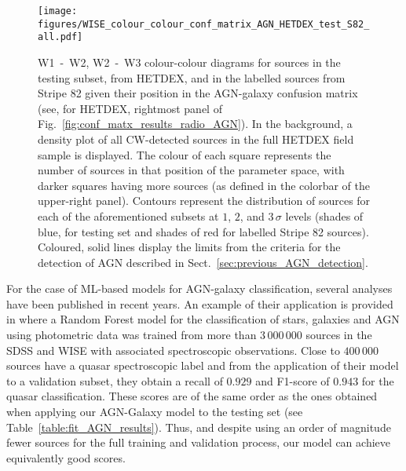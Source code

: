 \documentclass{aa}
\begin{document}
\begin{figure*}
   \centering
   \texttt{[image: figures/WISE\_colour\_colour\_conf\_matrix\_AGN\_HETDEX\_test\_S82\_all.pdf]}
   \caption{W1~-~W2, W2~-~W3 colour-colour diagrams for sources in the testing subset, from HETDEX, and in the labelled sources from Stripe 82 given their position in the AGN-galaxy confusion matrix (see, for HETDEX, rightmost panel of Fig.~\ref{fig:conf_matx_results_radio_AGN}). In the background, a density plot of all CW-detected sources in the full HETDEX field sample is displayed. The colour of each square represents the number of sources in that position of the parameter space, with darker squares having more sources (as defined in the colorbar of the upper-right panel). Contours represent the distribution of sources for each of the aforementioned subsets at $1$, $2$, and $3\,\sigma$ levels (shades of blue, for testing set and shades of red for labelled Stripe 82 sources). Coloured, solid lines display the limits from the criteria for the detection of AGN described in Sect.~\ref{sec:previous_AGN_detection}.}
   \label{fig:W1_W2_W2_W3_AGN_pred_HETDEX_S82}
\end{figure*}


For the case of ML-based models for AGN-galaxy classification, several analyses have been published in recent years. An example of their application is provided in \citet{2020A&A...639A..84C} where a Random Forest model for the classification of stars, galaxies and AGN using photometric data was trained from more than $3\,000\,000$ sources in the SDSS \citep[DR15;][]{2019ApJS..240...23A} and WISE with associated spectroscopic observations. Close to $400\,000$ sources have a quasar spectroscopic label and from the application of their model to a validation subset, they obtain a recall of $0.929$ and F1-score of $0.943$ for the quasar classification. These scores are of the same order as the ones obtained when applying our AGN-Galaxy model to the testing set (see Table~\ref{table:fit_AGN_results}). Thus, and despite using an order of magnitude fewer sources for the full training and validation process, our model can achieve equivalently good scores. 
\end{document}
